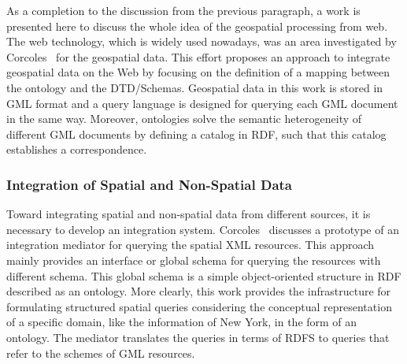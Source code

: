 \documentclass[a4paper,12pt]{article}
\begin{document}
As a completion to the discussion from the previous paragraph, a work is presented here to 
discuss the whole idea of the geospatial processing from web.
The web technology, which is widely used nowadays, 
was an area investigated by Corcoles~\cite{corcoles2003} for the geospatial data. 
This effort proposes an approach to integrate geospatial data on the Web by focusing on the definition of a mapping between the ontology and the DTD/Schemas. 
Geospatial data in this work is stored in GML format and a query language is designed for querying each GML document in the same way. 
Moreover, ontologies solve the semantic heterogeneity of different GML documents 
by defining a catalog in RDF, such that this catalog establishes a correspondence.

\subsubsection{Integration of Spatial and Non-Spatial Data}
\label{integration}
Toward integrating spatial and non-spatial data from different sources, 
it is necessary to develop an integration system. 
Corcoles~\cite{corcoles2003} discusses a prototype of an integration mediator for querying the spatial XML resources. 
This approach mainly provides an interface or global schema for querying the resources with different schema. 
This global schema is a simple object-oriented structure in RDF described as an ontology. 
More clearly, this work provides the infrastructure for formulating structured spatial queries 
considering the conceptual representation of a specific domain, like the information of New York, 
in the form of an ontology. The mediator translates the queries in terms of RDFS to queries that refer to the schemes of GML resources.
\end{document}
